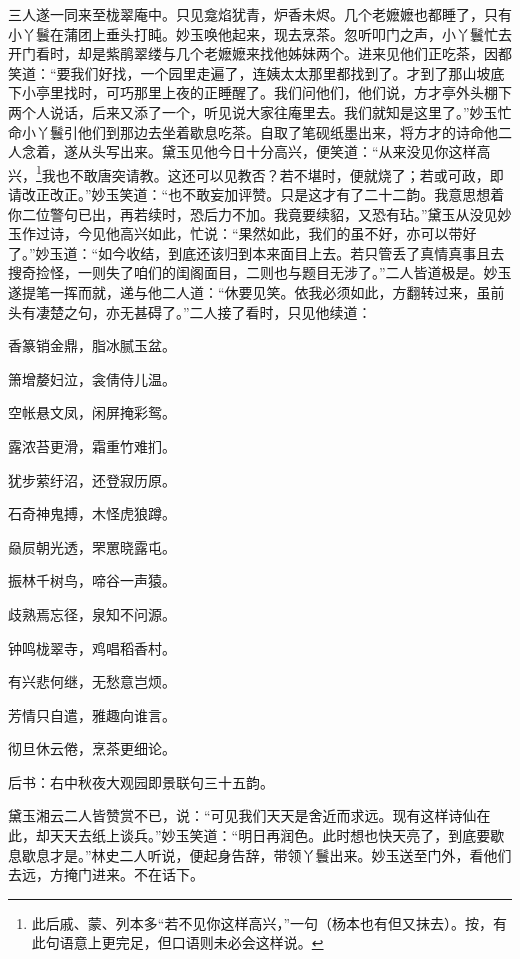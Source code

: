 三人遂一同来至栊翠庵中。只见龛焰犹青，炉香未烬。几个老嬷嬷也都睡了，只有小丫鬟在蒲团上垂头打盹。妙玉唤他起来，现去烹茶。忽听叩门之声，小丫鬟忙去开门看时，却是紫鹃翠缕与几个老嬷嬷来找他姊妹两个。进来见他们正吃茶，因都笑道：“要我们好找，一个园里走遍了，连姨太太那里都找到了。才到了那山坡底下小亭里找时，可巧那里上夜的正睡醒了。我们问他们，他们说，方才亭外头棚下两个人说话，后来又添了一个，听见说大家往庵里去。我们就知是这里了。”妙玉忙命小丫鬟引他们到那边去坐着歇息吃茶。自取了笔砚纸墨出来，将方才的诗命他二人念着，遂从头写出来。黛玉见他今日十分高兴，便笑道：“从来没见你这样高兴，\footnote{此后戚、蒙、列本多“若不见你这样高兴，”一句（杨本也有但又抹去）。按，有此句语意上更完足，但口语则未必会这样说。}我也不敢唐突请教。这还可以见教否？若不堪时，便就烧了；若或可政，即请改正改正。”妙玉笑道：“也不敢妄加评赞。只是这才有了二十二韵。我意思想着你二位警句已出，再若续时，恐后力不加。我竟要续貂，又恐有玷。”黛玉从没见妙玉作过诗，今见他高兴如此，忙说：“果然如此，我们的虽不好，亦可以带好了。”妙玉道：“如今收结，到底还该归到本来面目上去。若只管丢了真情真事且去搜奇捡怪，一则失了咱们的闺阁面目，二则也与题目无涉了。”二人皆道极是。妙玉遂提笔一挥而就，递与他二人道：“休要见笑。依我必须如此，方翻转过来，虽前头有凄楚之句，亦无甚碍了。”二人接了看时，只见他续道：

香篆销金鼎，脂冰腻玉盆。

箫增嫠妇泣，衾倩侍儿温。

空帐悬文凤，闲屏掩彩鸳。

露浓苔更滑，霜重竹难扪。

犹步萦纡沼，还登寂历原。

石奇神鬼搏，木怪虎狼蹲。

赑屃朝光透，罘罳晓露屯。

振林千树鸟，啼谷一声猿。

歧熟焉忘径，泉知不问源。

钟鸣栊翠寺，鸡唱稻香村。

有兴悲何继，无愁意岂烦。

芳情只自遣，雅趣向谁言。

彻旦休云倦，烹茶更细论。

后书：右中秋夜大观园即景联句三十五韵。

黛玉湘云二人皆赞赏不已，说：“可见我们天天是舍近而求远。现有这样诗仙在此，却天天去纸上谈兵。”妙玉笑道：“明日再润色。此时想也快天亮了，到底要歇息歇息才是。”林史二人听说，便起身告辞，带领丫鬟出来。妙玉送至门外，看他们去远，方掩门进来。不在话下。

